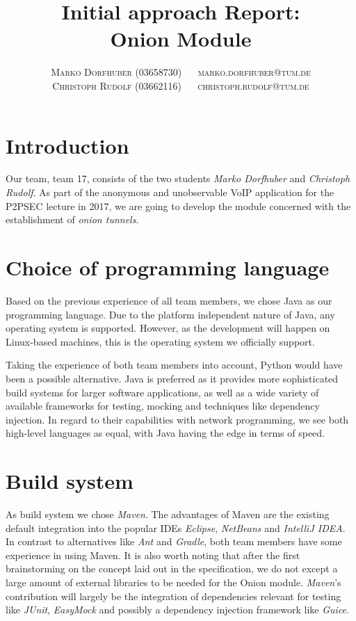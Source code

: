\documentclass[paper=letter, fontsize=12pt]{article}
\title{\vspace{-15mm}\fontsize{24pt}{10pt}\selectfont\textbf{Initial approach Report: \\Onion Module}} %
\author{
\large
{\textsc{Marko Dorfhuber (03658730) $\quad$ \Letter marko.dorfhuber@tum.de}}\\[2mm]
{\textsc{Christoph Rudolf (03662116) $\quad$ \Letter christoph.rudolf@tum.de}}\\[2mm]
}
\date{}
\begin{document}
\maketitle %
\thispagestyle{fancy} %


\section{Introduction}

Our team, team 17, consists of the two students \emph{Marko Dorfhuber} and \emph{Christoph Rudolf}. As part of the anonymous and unobservable VoIP application for the P2PSEC lecture in 2017, we are going to develop the module concerned with the establishment of \emph{onion tunnels}.


\section{Choice of programming language}
Based on the previous experience of all team members, we chose Java as our programming language. Due to the platform independent nature of Java, any operating system is supported. However, as the development will happen on Linux-based machines, this is the operating system we officially support.

Taking the experience of both team members into account, Python would have been a possible alternative. Java is preferred as it provides more sophisticated build systems for larger software applications, as well as a wide variety of available frameworks for testing, mocking and techniques like dependency injection. In regard to their capabilities with network programming, we see both high-level languages as equal, with Java having the edge in terms of speed. 

\section{Build system}
As build system we chose \emph{Maven}. The advantages of Maven are the existing default integration into the popular IDEs \emph{Eclipse}, \emph{NetBeans} and \emph{IntelliJ IDEA}. In contrast to alternatives like \emph{Ant} and \emph{Gradle}, both team members have some experience in using Maven. It is also worth noting that after the first brainstorming on the concept laid out in the specification, we do not except a large amount of external libraries to be needed for the Onion module. \emph{Maven}'s contribution will largely be the integration of dependencies relevant for testing like \emph{JUnit}, \emph{EasyMock} and possibly a dependency injection framework like \emph{Guice}.
\end{document}
